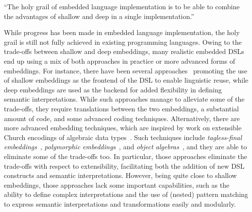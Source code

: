 \begin{quoting}
\noindent ``The holy grail of embedded language implementation is to be able to
combine the advantages of shallow and deep in a single implementation.''
\end{quoting}

While progress has been made in embedded language implementation, the holy grail
is still not fully achieved in existing programming languages. Owing to the
trade-offs between shallow and deep embeddings, many realistic embedded DSLs end
up using a mix of both approaches in practice or more advanced forms of
embeddings. For instance, there have been several
approaches~\citep{rompf2012scala,svenningsson2015combining,jovanovic2014yinyang}
promoting the use of shallow embeddings as the frontend of the DSL to enable
linguistic reuse, while deep embeddings are used as the backend for added
flexibility in defining semantic interpretations. While such approaches manage
to alleviate some of the trade-offs, they require translations between the two
embeddings, a substantial amount of code, and some advanced coding techniques.
Alternatively, there are more advanced embedding techniques, which are inspired
by work on extensible Church encodings of algebraic data
types~\citep{hinze2006generics,oliveira2006extensible,oliveira2009modular}. Such
techniques include \emph{tagless-final
embeddings}~\citep{carette2009finally,kiselyov2010typed}, \emph{polymorphic
embeddings}~\citep{hofer2008polymorphic}, and \emph{object
algebras}~\citep{oliveira2012extensibility}, and they are able to eliminate some
of the trade-offs too. In particular, those approaches eliminate the trade-offs
with respect to extensibility, facilitating both the addition of new DSL
constructs and semantic interpretations. However, being quite close to shallow
embeddings, those approaches lack some important capabilities, such as the
ability to define complex interpretations and the use of (nested) pattern
matching to express semantic interpretations and transformations easily and
modularly.

